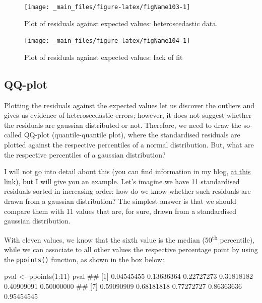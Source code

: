 \documentclass[a4paper,12pt,oneside]{book}
\newenvironment{Shaded}{\begin{snugshade}}{\end{snugshade}}
\newcommand{\DecValTok}[1]{#1}
\newcommand{\SpecialCharTok}[1]{#1}
\newcommand{\DocumentationTok}[1]{#1}
\newcommand{\OtherTok}[1]{#1}
\newcommand{\FunctionTok}[1]{#1}
\newcommand{\NormalTok}[1]{#1}
\begin{document}
\begin{figure}

{\centering \texttt{[image: \_main\_files/figure-latex/figName103-1]} 

}

\caption{Plot of residuals against expected values: heteroscedastic data.}\label{fig:figName103}
\end{figure}

\begin{figure}

{\centering \texttt{[image: \_main\_files/figure-latex/figName104-1]} 

}

\caption{Plot of residuals against expected values: lack of fit}\label{fig:figName104}
\end{figure}

\hypertarget{qq-plot}{%
\subsection{QQ-plot}\label{qq-plot}}

Plotting the residuals against the expected values let us discover the outliers and gives us evidence of heteroscedastic errors; however, it does not suggest whether the residuals are gaussian distributed or not. Therefore, we need to draw the so-called QQ-plot (quantile-quantile plot), where the standardised residuals are plotted against the respective percentiles of a normal distribution. But, what are the respective percentiles of a gaussian distribution?

I will not go into detail about this (you can find information in my blog, \href{https://www.statforbiology.com/2020/stat_general_percentiles/}{at this link}), but I will give you an example. Let's imagine we have 11 standardised residuals sorted in increasing order: how do we know whether such residuals are drawn from a gaussian distribution? The simplest answer is that we should compare them with 11 values that are, for sure, drawn from a standardised gaussian distribution.

With eleven values, we know that the sixth value is the median (50\textsuperscript{th} percentile), while we can associate to all other values the respective percentage point by using the \texttt{ppoints()} function, as shown in the box below:

\begin{Shaded}
\begin{Highlighting}[]
\NormalTok{pval }\OtherTok{\textless{}{-}} \FunctionTok{ppoints}\NormalTok{(}\DecValTok{1}\SpecialCharTok{:}\DecValTok{11}\NormalTok{)}
\NormalTok{pval}
\DocumentationTok{\#\#  [1] 0.04545455 0.13636364 0.22727273 0.31818182 0.40909091 0.50000000}
\DocumentationTok{\#\#  [7] 0.59090909 0.68181818 0.77272727 0.86363636 0.95454545}
\end{Highlighting}
\end{Shaded}
\end{document}
